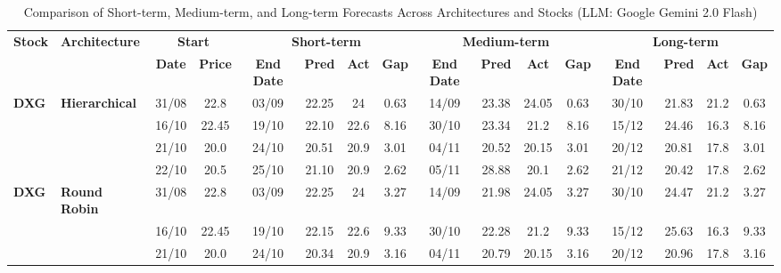 \documentclass{ieeeaccess}
\begin{document}
\begin{table}[!h]
\centering
\caption{Comparison of Short-term, Medium-term, and Long-term Forecasts Across Architectures and Stocks (LLM: Google Gemini 2.0 Flash)}
\label{tab:full_forecast}
\setlength{\tabcolsep}{3pt}
\renewcommand{\arraystretch}{1.05}
\scriptsize
\begin{tabular}{llcc|cccc|cccc|cccc}
\toprule
\multirow{2}{*}{\textbf{Stock}} &
\multirow{2}{*}{\textbf{Architecture}} &
\multicolumn{2}{c|}{\textbf{Start}} &
\multicolumn{4}{c|}{\textbf{Short-term}} &
\multicolumn{4}{c|}{\textbf{Medium-term}} &
\multicolumn{4}{c}{\textbf{Long-term}} \\
\cmidrule(lr){3-4}
\cmidrule(lr){5-8}
\cmidrule(lr){9-12}
\cmidrule(lr){13-16}
& &
\textbf{Date} & \textbf{Price} &
\textbf{End Date} & \textbf{Pred} & \textbf{Act} & \textbf{Gap} &
\textbf{End Date} & \textbf{Pred} & \textbf{Act} & \textbf{Gap} &
\textbf{End Date} & \textbf{Pred} & \textbf{Act} & \textbf{Gap} \\
\midrule


\multirow{4}{*}{\textbf{DXG}} 
& \textbf{Hierarchical}
& 31/08 & 22.8 & 03/09 & 22.25 & 24 & 0.63 & 14/09 & 23.38 & 24.05 & 0.63 & 30/10 & 21.83 & 21.2 & 0.63 \\

& 
& 16/10 & 22.45 & 19/10 & 22.10 & 22.6 & 8.16 & 30/10 & 23.34 & 21.2 & 8.16 & 15/12 & 24.46 & 16.3 & 8.16 \\

& 
& 21/10 & 20.0 & 24/10 & 20.51 & 20.9 & 3.01 & 04/11 & 20.52 & 20.15 & 3.01 & 20/12 & 20.81 & 17.8 & 3.01 \\

&
& 22/10 & 20.5 & 25/10 & 21.10 & 20.9 & 2.62 & 05/11 & 28.88 & 20.1 & 2.62 & 21/12 & 20.42 & 17.8 & 2.62 \\
\midrule


\multirow{4}{*}{\textbf{DXG}} 
& \textbf{Round Robin}
& 31/08 & 22.8 & 03/09 & 22.25 & 24 & 3.27 & 14/09 & 21.98 & 24.05 & 3.27 & 30/10 & 24.47 & 21.2 & 3.27 \\

&
& 16/10 & 22.45 & 19/10 & 22.15 & 22.6 & 9.33 & 30/10 & 22.28 & 21.2 & 9.33 & 15/12 & 25.63 & 16.3 & 9.33 \\

&
& 21/10 & 20.0 & 24/10 & 20.34 & 20.9 & 3.16 & 04/11 & 20.79 & 20.15 & 3.16 & 20/12 & 20.96 & 17.8 & 3.16 \\


\end{tabular}
\end{table}
\end{document}
